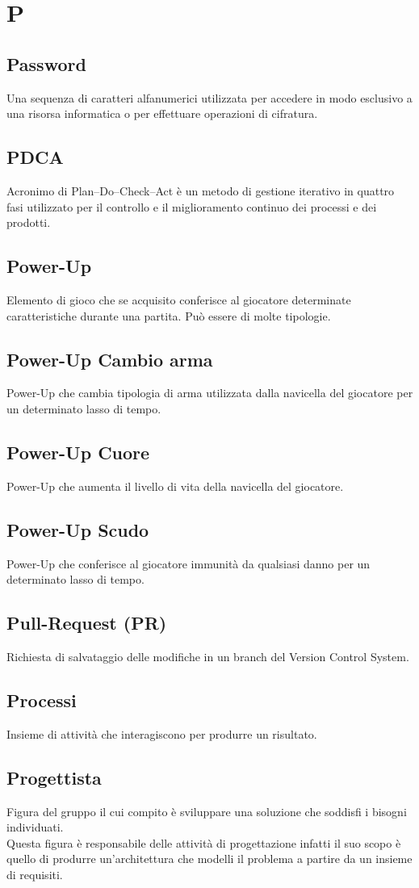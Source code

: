 \section{P}
	\subsection{Password}
		 Una sequenza di caratteri alfanumerici utilizzata per accedere in modo esclusivo a una risorsa informatica o per effettuare operazioni di cifratura.
	\subsection{PDCA} 
		 Acronimo di Plan–Do–Check–Act è un metodo di gestione iterativo in quattro fasi utilizzato per il controllo e il miglioramento continuo dei processi e dei prodotti.
	\subsection{Power-Up}
	    Elemento di gioco che se acquisito conferisce al giocatore determinate caratteristiche durante una partita. Può essere di molte tipologie.
	\subsection{Power-Up Cambio arma}
	    Power-Up che cambia tipologia di arma utilizzata dalla navicella del giocatore per un determinato lasso di tempo.
	\subsection{Power-Up Cuore}
	    Power-Up che aumenta il livello di vita della navicella del giocatore.
	\subsection{Power-Up Scudo}
	    Power-Up che conferisce al giocatore immunità da qualsiasi danno per un determinato lasso di tempo.
	\subsection{Pull-Request (PR)}  
		Richiesta di salvataggio delle modifiche in un branch del Version Control System.
	\subsection{Processi}  
		Insieme di attività che interagiscono per produrre un risultato.
	\subsection{Progettista} 
		Figura del gruppo il cui compito  è sviluppare una soluzione che soddisfi i bisogni individuati. \\
		Questa figura è responsabile delle attività di progettazione infatti il suo scopo è quello di produrre un’architettura che modelli il problema a partire da un insieme di requisiti.
